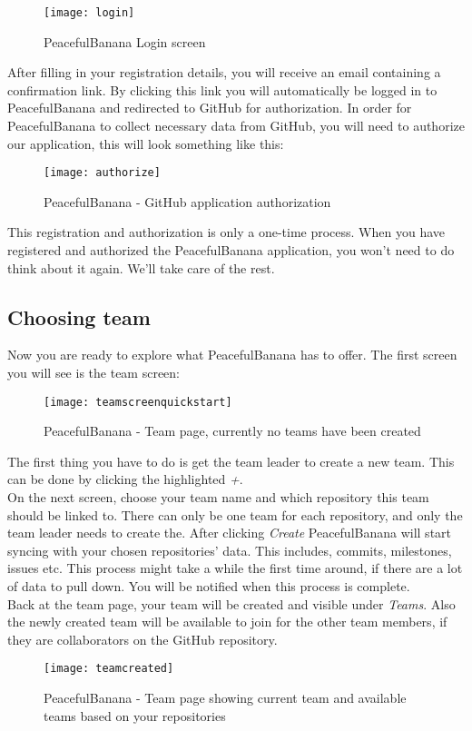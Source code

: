 \begin{figure}[h!]
\label{login}
\centering
	\texttt{[image: login]}
\caption{PeacefulBanana Login screen}
\end{figure}
\pagebreak

After filling in your registration details, you will receive an email containing a confirmation link. By clicking this link you will automatically be logged in to PeacefulBanana and redirected to GitHub for authorization. 
In order for PeacefulBanana to collect necessary data from GitHub, you will need to authorize our application, this will look something like this: 

\begin{figure}[h!]
\label{authorize}
\centering
	\texttt{[image: authorize]}
\caption{PeacefulBanana - GitHub application authorization}
\end{figure}

This registration and authorization is only a one-time process. When you have registered and authorized the PeacefulBanana application, you won't need to do think about it again. We'll take care of the rest. 
\pagebreak

%
%
\subsection{Choosing team}
Now you are ready to explore what PeacefulBanana has to offer. The first screen you will see is the team screen:

\begin{figure}[h!]
\label{teamscreen}
\centering
	\texttt{[image: teamscreenquickstart]}
\caption{PeacefulBanana - Team page, currently no teams have been created}
\end{figure}

The first thing you have to do is get the team leader to create a new team. This can be done by clicking the highlighted \emph{+}. \\
On the next screen, choose your team name and which repository this team should be linked to. There can only be one team for each repository, and only the team leader needs to create the. After clicking \textit{Create} PeacefulBanana will start syncing with your chosen repositories' data. This includes, commits, milestones, issues etc. This process might take a while the first time around, if there are a lot of data to pull down. You will be notified when this process is complete.\\
Back at the team page, your team will be created and visible under \emph{Teams}. Also the newly created team will be available to join for the other team members, if they are collaborators on the GitHub repository. 
\begin{figure}[h!]
\label{teamcreated}
\centering
	\texttt{[image: teamcreated]}
\caption{PeacefulBanana - Team page showing current team and available teams based on your repositories}
\end{figure}

